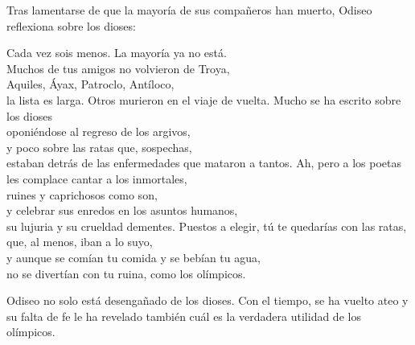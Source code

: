 Tras lamentarse de que la mayoría de sus compañeros han muerto, Odiseo reflexiona sobre los dioses:

\begin{versopropio}
Cada vez sois menos. La mayoría ya no está.\\
Muchos de tus amigos no volvieron de Troya,\\
Aquiles, Áyax, Patroclo, Antíloco,\\
la lista es larga. Otros murieron en el viaje de vuelta.
\stanzabreak
Mucho se ha escrito sobre los dioses\\
oponiéndose al regreso de los argivos,\\
y poco sobre las ratas que, sospechas,\\
estaban detrás de las enfermedades que mataron a tantos.
\stanzabreak
Ah, pero a los poetas les complace cantar a los inmortales,\\
ruines y caprichosos como son,\\
y celebrar sus enredos en los asuntos humanos,\\
su lujuria y su crueldad dementes.
\stanzabreak
Puestos a elegir, tú te quedarías con las ratas,\\
que, al menos, iban a lo suyo,\\
y aunque se comían tu comida y se bebían tu agua,\\
no se divertían con tu ruina, como los olímpicos.
\end{versopropio}

Odiseo no solo está desengañado de los dioses. Con el tiempo, se ha vuelto ateo y su falta de fe le ha revelado también cuál es la verdadera utilidad de los olímpicos.

